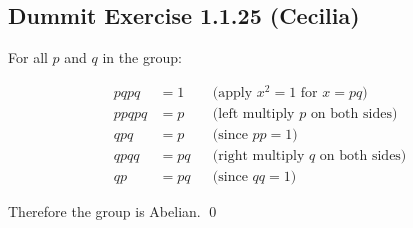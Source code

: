 \subsection*{Dummit Exercise 1.1.25 (Cecilia)}

For all $p$ and $q$ in the group:

\begin{align*}
  pqpq &= 1   && \text{(apply } x^2 = 1 \text{ for } x = pq \text{)} \\
  ppqpq &= p  && \text{(left multiply } p \text{ on both sides)} \\
  qpq &= p    && \text{(since } pp = 1 \text{)} \\
  qpqq &= pq  && \text{(right multiply } q \text{ on both sides)} \\
  qp &= pq    && \text{(since } qq = 1 \text{)}
\end{align*}

Therefore the group is Abelian. \qed
